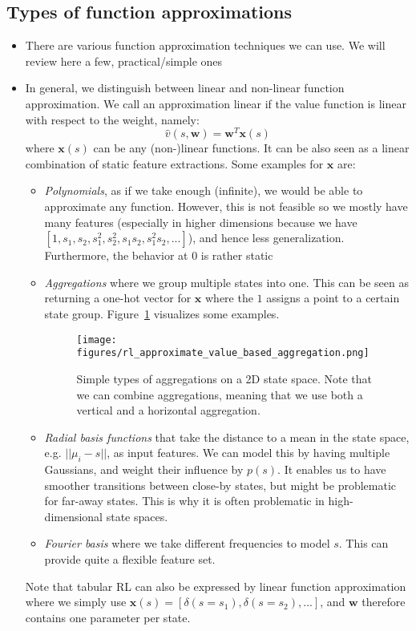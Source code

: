 \subsection{Types of function approximations}
\begin{itemize}
	\item There are various function approximation techniques we can use. We will review here a few, practical/simple ones
	\item In general, we distinguish between linear and non-linear function approximation. We call an approximation linear if the value function is linear with respect to the weight, namely:
	$$\hat{v}(s,\bm{w})=\bm{w}^T\bm{x}(s)$$
	where $\bm{x}(s)$ can be any (non-)linear functions. It can be also seen as a linear combination of static feature extractions. Some examples for $\bm{x}$ are:
	\begin{itemize}
		\item \textit{Polynomials}, as if we take enough (infinite), we would be able to approximate any function. However, this is not feasible so we mostly have many features (especially in higher dimensions because we have $\left[1,s_1,s_2,s_1^2, s_2^2, s_1s_2, s_1^2s_2,...\right]$), and hence less generalization. Furthermore, the behavior at 0 is rather static
		\item \textit{Aggregations} where we group multiple states into one. This can be seen as returning a one-hot vector for $\bm{x}$ where the $1$ assigns a point to a certain state group. Figure~\ref{fig:rl_approximate_value_based_aggregation} visualizes some examples.
		\begin{figure}[ht!]
			\centering
			\texttt{[image: figures/rl\_approximate\_value\_based\_aggregation.png]}
			\caption{Simple types of aggregations on a 2D state space. Note that we can combine aggregations, meaning that we use both a vertical and a horizontal aggregation.}
			\label{fig:rl_approximate_value_based_aggregation}
		\end{figure}
		\item \textit{Radial basis functions} that take the distance to a mean in the state space, e.g. $||\mu_i-s||$, as input features. We can model this by having multiple Gaussians, and weight their influence by $p(s)$. It enables us to have smoother transitions between close-by states, but might be problematic for far-away states. This is why it is often problematic in high-dimensional state spaces.
		\item \textit{Fourier basis} where we take different frequencies to model $s$. This can provide quite a flexible feature set.
	\end{itemize}
	Note that tabular RL can also be expressed by linear function approximation where we simply use $\bm{x}(s)=\left[\delta(s=s_1), \delta(s=s_2),...\right]$, and $\bm{w}$ therefore contains one parameter per state.
	

\end{itemize}
